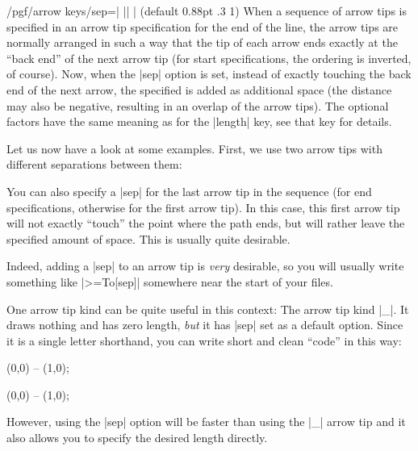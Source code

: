 \begin{key}{/pgf/arrow keys/sep=| || | (default 0.88pt .3 1)%
}
    When a sequence of arrow tips is specified in an arrow tip specification
    for the end of the line, the arrow tips are normally arranged in such a way
    that the tip of each arrow ends exactly at the ``back end'' of the next
    arrow tip (for start specifications, the ordering is inverted, of course).
    Now, when the |sep| option is set, instead of exactly touching the back end
    of the next arrow, the specified  is added as additional
    space (the distance may also be negative, resulting in an overlap of the
    arrow tips). The optional factors have the same meaning as for the |length|
    key, see that key for details.

    Let us now have a look at some examples. First, we use two arrow tips with
    different separations between them:
\begin{codeexample}[preamble={\usetikzlibrary{arrows.meta}}]
\end{codeexample}

    You can also specify a |sep| for the last arrow tip in the sequence (for
    end specifications, otherwise for the first arrow tip). In this case, this
    first arrow tip will not exactly ``touch'' the point where the path ends,
    but will rather leave the specified amount of space. This is usually quite
    desirable.
\begin{codeexample}[preamble={\usetikzlibrary{arrows.meta,positioning}}]
\end{codeexample}
    Indeed, adding a |sep| to an arrow tip is \emph{very} desirable, so you
    will usually write something like |>={To[sep]}| somewhere near the start of
    your files.

    One arrow tip kind can be quite useful in this context: The arrow tip kind
    |_|. It draws nothing and has zero length, \emph{but} it has |sep| set as a
    default option. Since it is a single letter shorthand, you can write short
    and clean ``code'' in this way:
\begin{codeexample}[]
\tikz \draw [->_>] (0,0) -- (1,0);
\end{codeexample}
\begin{codeexample}[]
\tikz \draw [->__>] (0,0) -- (1,0);
\end{codeexample}
    However, using the |sep| option will be faster than using the |_| arrow tip
    and it also allows you to specify the desired length directly.
\end{key}


